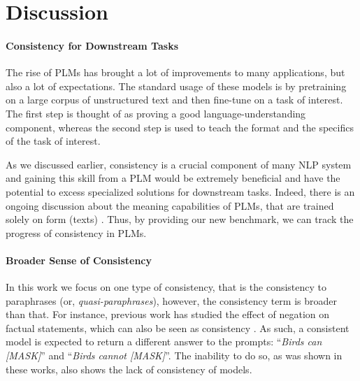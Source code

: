 \section{Discussion}
\label{sec:discussion}

\paragraph{Consistency for Downstream Tasks}

The rise of PLMs has brought a lot of improvements to many applications, but also a lot of expectations. The standard usage of these models is by pretraining on a large corpus of unstructured text and then fine-tune on a task of interest. The first step is thought of as proving a good language-understanding component, whereas the second step is used to teach the format and the specifics of the task of interest.

As we discussed earlier, consistency is a crucial component of many NLP system \cite{du2019consistent,consistent-qa,denis2009global,kryscinski2020evaluating} and gaining this skill from a PLM would be extremely beneficial and have the potential to excess specialized solutions for downstream tasks.
Indeed, there is an ongoing discussion about the meaning capabilities of PLMs, that are trained solely on form (texts) \cite{bender2020climbing} .
Thus, by providing our new benchmark, we can track the progress of consistency in PLMs.


\paragraph{Broader Sense of Consistency}
In this work we focus on one type of consistency, that is the consistency to paraphrases (or, \textit{quasi-paraphrases}), however, the consistency term is broader than that.
For instance, previous work has studied the effect of negation on factual statements, which can also be seen as consistency \cite{Ettinger_2020,kassner-schutze-2020-negated}. As such, a consistent model is expected to return a different answer to the prompts: ``\textit{Birds can [MASK]}'' and ``\textit{Birds cannot [MASK]}''. The inability to do so, as was shown in these works, also shows the lack of consistency of models.


